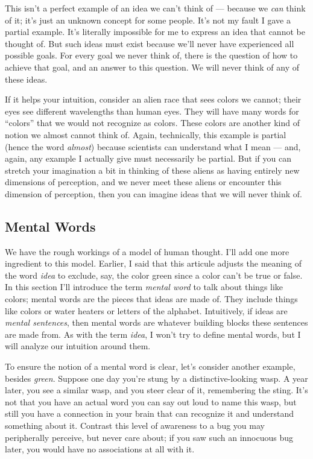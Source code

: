 \documentclass[11pt, oneside]{article}   	%
\begin{document}
This isn't a perfect example of an idea we can't think of --- because we {\em
can} think of it; it's just an unknown concept for some people.
It's not my fault I
gave a partial example.
It's literally impossible for me to express an idea that
cannot be thought of.
But such ideas must exist because we'll never
have experienced all possible goals.
For every goal we never think of,
there is the question of how to achieve that goal, and an answer to this
question. We will never think of any of these ideas.

If it helps your intuition, consider an alien race that sees colors we cannot;
their eyes see different wavelengths than human eyes.
They will have many words for ``colors''
that we would not recognize as colors. These colors are another kind of notion
we almost cannot think of.
Again, technically, this example is
partial (hence the word {\em almost})
because scientists can understand what I mean --- and, again, any
example I actually give must necessarily be partial. But if you can stretch your
imagination a bit in thinking of these aliens as having entirely new dimensions
of perception, and we never meet these aliens or encounter this dimension of
perception, then you can imagine ideas that we will never think of.


\subsection{Mental Words}\label{s_mental_words}

We have the rough workings of a model of human thought.
I'll add one more
ingredient to this model.
Earlier, I said that this articule adjusts the meaning of the word
{\em idea} to exclude, say, the color green since a color
can't be true or false.
In this section I'll introduce the term {\em mental word} to talk about
things like colors;
mental words are
the pieces that ideas are made of.
They include things like
colors or water heaters or letters of the alphabet.
Intuitively, if
ideas are {\em mental sentences}, then mental words are whatever building
blocks these sentences are made from.
As with the term {\em idea}, I won't try to define mental words,
but I will analyze our intuition around them.

To ensure the notion of a mental word is clear, let's consider another example,
besides {\em green}.
Suppose one day you're stung
by a distinctive-looking wasp.
A year later, you see a similar wasp, and you
steer clear of it, remembering the sting.
It's not that you have an actual word you can say out loud to name this wasp,
but still you have a connection in your brain that can recognize it and
understand something about it.
Contrast this level of awareness to a bug you may peripherally perceive, but
never care about; if you saw such an innocuous bug later, you would have no
associations at all with it.
\end{document}
